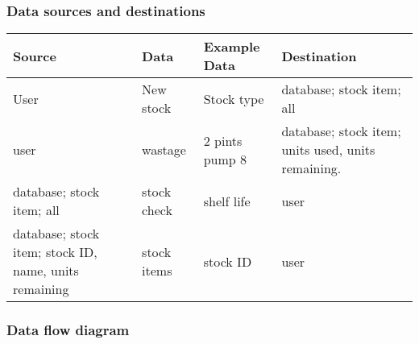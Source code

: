 \subsubsection{Data sources and destinations}
\begin{center}
\begin{tabular}{|l|l|l|l|}
    \hline
    \textbf{Source} & \textbf{Data} & \textbf{Example Data} & \textbf{Destination} \\ \hline
	User & New stock & Stock type & database; stock item; all \\ \hline
	user & wastage & 2 pints pump 8 &database; stock item; units used, units remaining. \\ \hline
	database; stock item; all & stock check & shelf life & user \\ \hline
	database; stock item; stock ID, name, units remaining & stock items & stock ID & user \\ \hline
	
	
    
\end{tabular}
\label{tab:range_examples}
\end{center}

\subsubsection{Data flow diagram}

